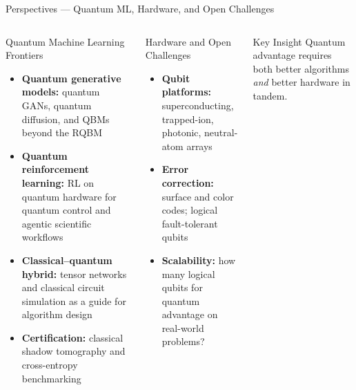 \documentclass[aspectratio=169,12pt]{beamer}
\begin{document}
\begin{frame}{Perspectives --- Quantum ML, Hardware, and Open Challenges}
  \begin{columns}[T]
      \begin{block}{Quantum Machine Learning Frontiers}
        \begin{itemize}\small\itemsep1pt
          \item \textbf{Quantum generative models:}
                quantum GANs, quantum diffusion,
                and QBMs beyond the RQBM
          \item \textbf{Quantum reinforcement learning:}
                RL on quantum hardware for
                quantum control and
                agentic scientific workflows
          \item \textbf{Classical--quantum hybrid:}
                tensor networks and classical
                circuit simulation as a
                guide for algorithm design
          \item \textbf{Certification:}
                classical shadow tomography
                and cross-entropy benchmarking
        \end{itemize}
      \end{block}
      \begin{block}{Hardware and Open Challenges}
        \begin{itemize}\small\itemsep1pt
          \item \textbf{Qubit platforms:}
                superconducting, trapped-ion,
                photonic, neutral-atom arrays
          \item \textbf{Error correction:}
                surface and color codes;
                logical fault-tolerant qubits
          \item \textbf{Scalability:}
                how many logical qubits for
                quantum advantage on
                real-world problems?
        \end{itemize}
      \end{block}
      \begin{alertblock}{Key Insight}
        Quantum advantage requires both
        better algorithms \emph{and}
        better hardware in tandem.
      \end{alertblock}
  \end{columns}
\end{frame}
\end{document}
